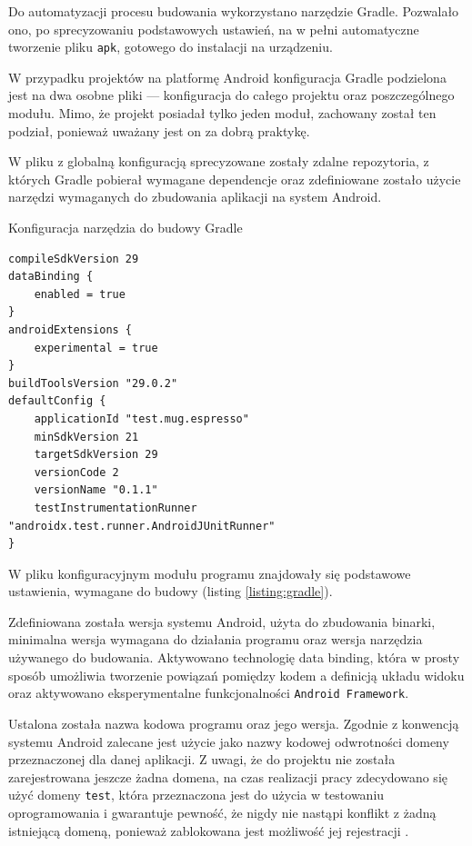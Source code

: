 \documentclass[polish,polish,a4paper,12pt]{article}
\begin{document}
	Do automatyzacji procesu budowania wykorzystano narzędzie Gradle. Pozwalało ono, po sprecyzowaniu podstawowych ustawień, na w pełni automatyczne tworzenie pliku \texttt{apk}, gotowego do instalacji na urządzeniu.

	W przypadku projektów na platformę Android konfiguracja Gradle podzielona jest na dwa osobne pliki — konfiguracja do całego projektu oraz poszczególnego modułu. Mimo, że projekt posiadał tylko jeden moduł, zachowany został ten podział, ponieważ uważany jest on za dobrą praktykę.

	W pliku z globalną konfiguracją sprecyzowane zostały zdalne repozytoria, z których Gradle pobierał wymagane dependencje oraz zdefiniowane zostało użycie narzędzi wymaganych do zbudowania aplikacji na system Android.

	\begin{listing}[H]
		\caption{Konfiguracja narzędzia do budowy Gradle}
		\begin{verbatim}
compileSdkVersion 29
dataBinding {
	enabled = true
}
androidExtensions {
	experimental = true
}
buildToolsVersion "29.0.2"
defaultConfig {
	applicationId "test.mug.espresso"
	minSdkVersion 21
	targetSdkVersion 29
	versionCode 2
	versionName "0.1.1"
	testInstrumentationRunner "androidx.test.runner.AndroidJUnitRunner"
}
		\end{verbatim}
		\label{listing:gradle}
	\end{listing}

	W pliku konfiguracyjnym modułu programu znajdowały się podstawowe ustawienia, wymagane do budowy (listing \ref{listing:gradle}).

	Zdefiniowana została wersja systemu Android, użyta do zbudowania binarki, minimalna wersja wymagana do działania programu oraz wersja narzędzia używanego do budowania. Aktywowano technologię data binding, która w prosty sposób umożliwia tworzenie powiązań pomiędzy kodem a definicją układu widoku oraz aktywowano eksperymentalne funkcjonalności \texttt{Android Framework}.

	Ustalona została nazwa kodowa programu oraz jego wersja. Zgodnie z konwencją systemu Android zalecane jest użycie jako nazwy kodowej odwrotności domeny przeznaczonej dla danej aplikacji. Z uwagi, że do projektu nie została zarejestrowana jeszcze żadna domena, na czas realizacji pracy zdecydowano się użyć domeny \texttt{test}, która przeznaczona jest do użycia w testowaniu oprogramowania i gwarantuje pewność, że nigdy nie nastąpi konflikt z żadną istniejącą domeną, ponieważ zablokowana jest możliwość jej rejestracji \cite{testdomainwiki}.
\end{document}

